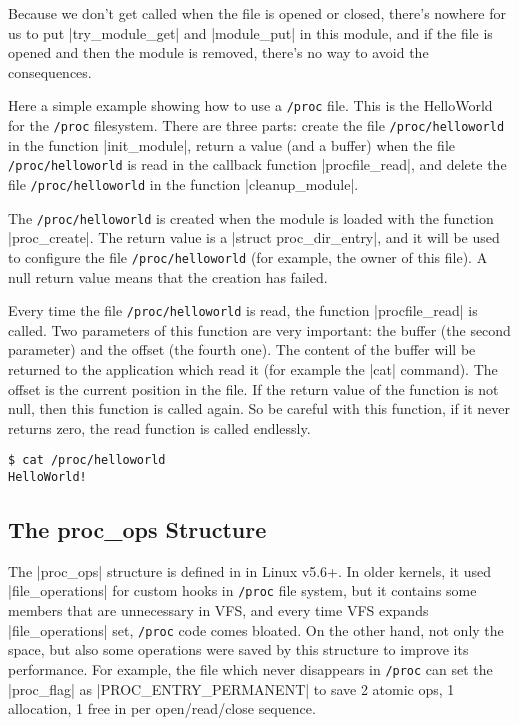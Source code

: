 \documentclass[10pt, oneside]{book}
\begin{document}
Because we don't get called when the file is opened or closed, there's nowhere for us to put \cpp|try_module_get| and \cpp|module_put| in this module, and if the file is opened and then the module is removed, there's no way to avoid the consequences.

Here a simple example showing how to use a \verb|/proc| file.
This is the HelloWorld for the \verb|/proc| filesystem.
There are three parts: create the file \verb|/proc/helloworld| in the function \cpp|init_module|, return a value (and a buffer) when the file \verb|/proc/helloworld| is read in the callback function \cpp|procfile_read|, and delete the file \verb|/proc/helloworld| in the function \cpp|cleanup_module|.

The \verb|/proc/helloworld| is created when the module is loaded with the function \cpp|proc_create|.
The return value is a \cpp|struct proc_dir_entry|, and it will be used to configure the file \verb|/proc/helloworld| (for example, the owner of this file).
A null return value means that the creation has failed.

Every time the file \verb|/proc/helloworld| is read, the function \cpp|procfile_read| is called.
Two parameters of this function are very important: the buffer (the second parameter) and the offset (the fourth one).
The content of the buffer will be returned to the application which read it (for example the \sh|cat| command).
The offset is the current position in the file.
If the return value of the function is not null, then this function is called again.
So be careful with this function, if it never returns zero, the read function is called endlessly.

\begin{verbatim}
$ cat /proc/helloworld
HelloWorld!
\end{verbatim}


\subsection{The proc\_ops Structure}
\label{sec:proc_ops}
The \cpp|proc_ops| structure is defined in  in Linux v5.6+.
In older kernels, it used \cpp|file_operations| for custom hooks in \verb|/proc| file system, but it contains some members that are unnecessary in VFS, and every time VFS expands \cpp|file_operations| set, \verb|/proc| code comes bloated.
On the other hand, not only the space, but also some operations were saved by this structure to improve its performance.
For example, the file which never disappears in \verb|/proc| can set the \cpp|proc_flag| as \cpp|PROC_ENTRY_PERMANENT| to save 2 atomic ops, 1 allocation, 1 free in per open/read/close sequence.
\end{document}
